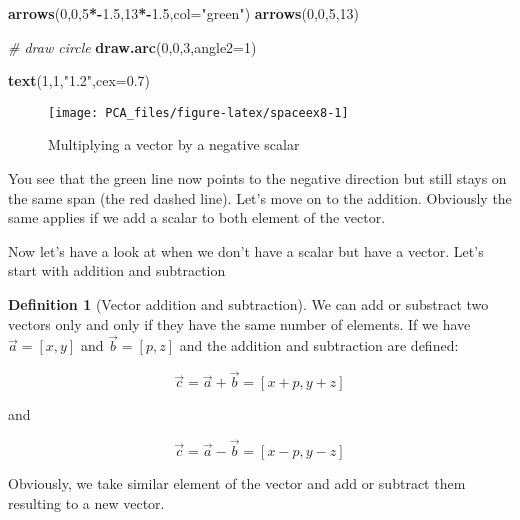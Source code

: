 \documentclass[
]{book}
\newenvironment{Shaded}{\begin{snugshade}}{\end{snugshade}}
\newcommand{\CommentTok}[1]{\textcolor[rgb]{0.56,0.35,0.01}{\textit{#1}}}
\newcommand{\DataTypeTok}[1]{\textcolor[rgb]{0.13,0.29,0.53}{#1}}
\newcommand{\DecValTok}[1]{\textcolor[rgb]{0.00,0.00,0.81}{#1}}
\newcommand{\FloatTok}[1]{\textcolor[rgb]{0.00,0.00,0.81}{#1}}
\newcommand{\KeywordTok}[1]{\textcolor[rgb]{0.13,0.29,0.53}{\textbf{#1}}}
\newcommand{\NormalTok}[1]{#1}
\newcommand{\OperatorTok}[1]{\textcolor[rgb]{0.81,0.36,0.00}{\textbf{#1}}}
\newcommand{\StringTok}[1]{\textcolor[rgb]{0.31,0.60,0.02}{#1}}
\theoremstyle{definition}
\newtheorem{definition}{Definition}[chapter]
\theoremstyle{definition}
\theoremstyle{definition}
\theoremstyle{remark}
\begin{document}
\begin{Shaded}
\begin{Highlighting}[]
\KeywordTok{arrows}\NormalTok{(}\DecValTok{0}\NormalTok{,}\DecValTok{0}\NormalTok{,}\DecValTok{5}\OperatorTok{*-}\FloatTok{1.5}\NormalTok{,}\DecValTok{13}\OperatorTok{*-}\FloatTok{1.5}\NormalTok{,}\DataTypeTok{col=}\StringTok{"green"}\NormalTok{)}
\KeywordTok{arrows}\NormalTok{(}\DecValTok{0}\NormalTok{,}\DecValTok{0}\NormalTok{,}\DecValTok{5}\NormalTok{,}\DecValTok{13}\NormalTok{)}

\CommentTok{# draw circle}
\KeywordTok{draw.arc}\NormalTok{(}\DecValTok{0}\NormalTok{,}\DecValTok{0}\NormalTok{,}\DecValTok{3}\NormalTok{,}\DataTypeTok{angle2=}\DecValTok{1}\NormalTok{)}

\KeywordTok{text}\NormalTok{(}\DecValTok{1}\NormalTok{,}\DecValTok{1}\NormalTok{,}\StringTok{"1.2"}\NormalTok{,}\DataTypeTok{cex=}\FloatTok{0.7}\NormalTok{)}
\end{Highlighting}
\end{Shaded}

\begin{figure}

{\centering \texttt{[image: PCA\_files/figure-latex/spaceex8-1]} 

}

\caption{Multiplying a vector by a negative scalar}\label{fig:spaceex8}
\end{figure}

You see that the green line now points to the negative direction but still stays on the same span (the red dashed line). Let's move on to the addition. Obviously the same applies if we add a scalar to both element of the vector.

Now let's have a look at when we don't have a scalar but have a vector. Let's start with addition and subtraction

\begin{definition}[Vector addition and subtraction]
\protect\hypertarget{def:vaddition}{}{\label{def:vaddition} \iffalse (Vector addition and subtraction) \fi{} }
We can add or substract two vectors only and only if they have the same number of elements. If we have \(\vec{a}=[x,y]\) and \(\vec{b}=[p,z]\) and the addition and subtraction are defined:

\[\vec{c}=\vec{a}+\vec{b}=[x+p, y+z]\]

and

\[\vec{c}=\vec{a}-\vec{b}=[x-p, y-z]\]

Obviously, we take similar element of the vector and add or subtract them resulting to a new vector.
\end{definition}
\end{document}
